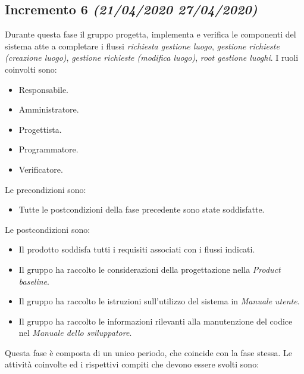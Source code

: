 \documentclass[../piano-di-progetto.tex]{subfiles}
\begin{document}
\subsection[Incremento 6]{Incremento 6 {\normalsize\normalfont\itshape(21/04/2020  27/04/2020)}}%
\label{sub:incremento_6}
Durante questa fase il gruppo progetta, implementa e verifica le componenti del sistema atte a completare i flussi \textit{richiesta gestione luogo}, \textit{gestione richieste (creazione luogo)}, \textit{gestione richieste (modifica luogo)}, \textit{root gestione luoghi}.
I ruoli coinvolti sono:
\begin{itemize}
  \item Responsabile.
  \item Amministratore.
  \item Progettista.
  \item Programmatore.
  \item Verificatore.
\end{itemize}
Le precondizioni sono:
\begin{itemize}
  \item Tutte le postcondizioni della fase precedente sono state soddisfatte.
\end{itemize}
Le postcondizioni sono:
\begin{itemize}
  \item Il prodotto soddisfa tutti i requisiti associati con i flussi indicati.
  \item Il gruppo ha raccolto le considerazioni della progettazione nella \textit{Product baseline}.
  \item Il gruppo ha raccolto le istruzioni sull'utilizzo del sistema in \textit{Manuale utente}.
  \item Il gruppo ha raccolto le informazioni rilevanti alla manutenzione del codice nel \textit{Manuale dello sviluppatore}.
\end{itemize}
Questa fase è composta di un unico periodo, che coincide con la fase stessa.
Le attività coinvolte ed i rispettivi compiti che devono essere svolti sono:
\end{document}
